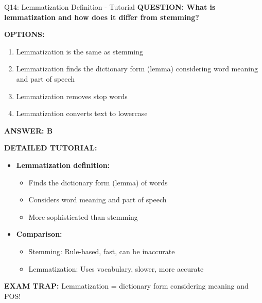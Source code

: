 \documentclass[8pt]{beamer}
\begin{document}
	\begin{frame}{Q14: Lemmatization Definition - Tutorial}
		\fontsize{6.5}{7.5}\selectfont
		\textbf{QUESTION: What is lemmatization and how does it differ from stemming?}
		
		\vspace{0.1cm}
		\textbf{OPTIONS:}
		\begin{enumerate}
			\item Lemmatization is the same as stemming
			\item Lemmatization finds the dictionary form (lemma) considering word meaning and part of speech
			\item Lemmatization removes stop words
			\item Lemmatization converts text to lowercase
		\end{enumerate}
		
		\vspace{0.1cm}
		\textcolor{myblue}{\textbf{ANSWER: B}}
		
		\vspace{0.1cm}
		\textbf{DETAILED TUTORIAL:}
		\begin{itemize}
			\item \textbf{Lemmatization definition:}
			\begin{itemize}
				\item Finds the dictionary form (lemma) of words
				\item Considers word meaning and part of speech
				\item More sophisticated than stemming
			\end{itemize}
			\item \textbf{Comparison:}
			\begin{itemize}
				\item Stemming: Rule-based, fast, can be inaccurate
				\item Lemmatization: Uses vocabulary, slower, more accurate
			\end{itemize}
		\end{itemize}
		
		\textcolor{myred}{\textbf{EXAM TRAP:}} Lemmatization = \textcolor{myblue}{dictionary form considering meaning and POS}!
	\end{frame}
	
\end{document}
